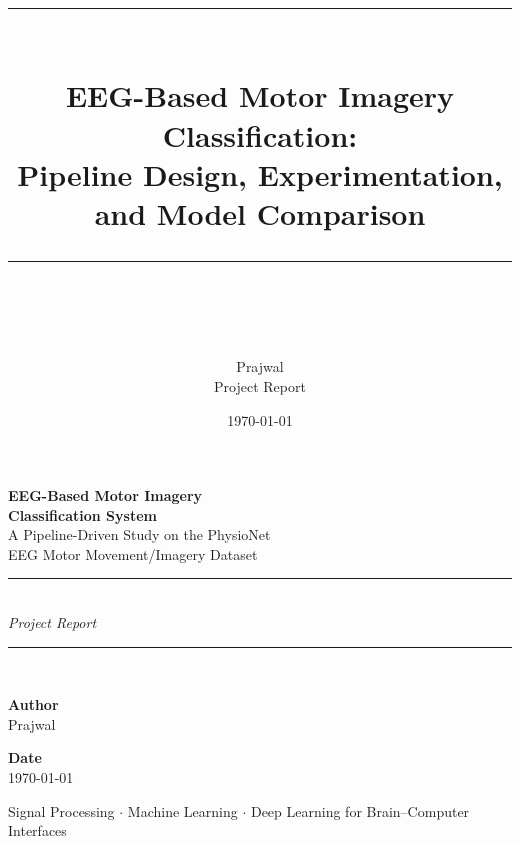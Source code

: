 \documentclass[11pt,a4paper]{article}
\title{
    \vspace{-2cm}
    \rule{\linewidth}{0.5mm}\\[0.4cm]
    {\huge \bfseries EEG-Based Motor Imagery Classification:\\[0.2cm] Pipeline Design, Experimentation, and Model Comparison}\\[0.3cm]
    \rule{\linewidth}{0.5mm}\\[1cm]
}
\author{
    \Large Prajwal \\[0.3cm]
    \normalsize Project Report
}
\date{\normalsize \today}
\begin{document}
\begin{titlepage}
\centering
\vspace*{2cm}

{\Huge \bfseries EEG-Based Motor Imagery\\[0.3cm] Classification System}\\[0.5cm]
{\Large A Pipeline-Driven Study on the PhysioNet\\ EEG Motor Movement/Imagery Dataset}\\[2cm]

\rule{0.8\linewidth}{0.4pt}\\[0.5cm]
{\large \textit{Project Report}}\\[0.5cm]
\rule{0.8\linewidth}{0.4pt}\\[2.5cm]

\begin{minipage}{0.45\textwidth}
\begin{flushleft} \large
\textbf{Author}\\
Prajwal
\end{flushleft}
\end{minipage}
\begin{minipage}{0.45\textwidth}
\begin{flushright} \large
\textbf{Date}\\
\today
\end{flushright}
\end{minipage}

\vfill

{\large Signal Processing \(\cdot\) Machine Learning \(\cdot\) Deep Learning for Brain--Computer Interfaces}

\end{titlepage}

\tableofcontents
\thispagestyle{empty}
\newpage

\end{document}
